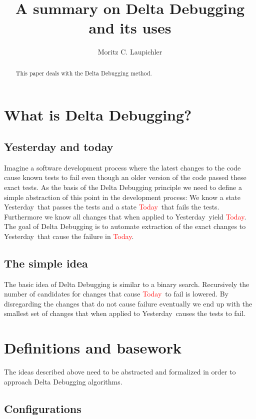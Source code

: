 \documentclass[a4paper,UKenglish]{lipics-v2018}
\title{A summary on Delta Debugging and its uses}
\author{Moritz C. Laupichler}{Fakultät für Informatik, Karlsruhe Institute of Technology, Germany}{moritz.laupichler@student.kit.edu}{}{}
\newcommand{\green}[1]{\textcolor{td-green}{#1}}
\newcommand{\red}[1]{\textcolor{red}{#1}}
\newcommand{\yd}[0]{\green{Yesterday}}
\newcommand{\td}[0]{\red{Today}}
\begin{document}
\maketitle

\begin{abstract}
	This paper deals with the Delta Debugging method.
\end{abstract}
	
\section{What is Delta Debugging?}

\subsection{Yesterday and today}
\label{ydandtd}

Imagine a software development process where the latest changes to the code cause known tests to fail even though an older version of the code passed these exact tests. As the basis of the Delta Debugging principle we need to define a simple abstraction of this point in the development process: We know a state \yd\ that passes the tests and a state \td\ that fails the tests. Furthermore we know all changes that when applied to \yd\ yield \td. \\
The goal of Delta Debugging is to automate extraction of the exact changes to \yd\ that cause the failure in \td.  

\subsection{The simple idea}
\label{ddidea}

The basic idea of Delta Debugging is similar to a binary search. Recursively the number of candidates for changes that cause \td\ to fail is lowered. By disregarding the changes that do not cause failure eventually we end up with the smallest set of changes that when applied to \yd\ causes the tests to fail. 



\section{Definitions and basework}

The ideas described above need to be abstracted and formalized in order to approach Delta Debugging algorithms.

\subsection{Configurations}
\end{document}
